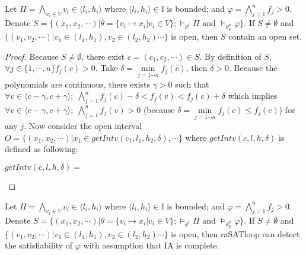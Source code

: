 \begin{lemma} \label{lem:sat-complete}
Let $\Pi = \bigwedge\limits_{v_i \in V} v_i \in \langle l_i, h_i \rangle$ where $\langle l_i, h_i \rangle \in \mathbb{I}$ is bounded; and ${\varphi = \bigwedge\limits_{j = 1}^n f_j > 0}$. Denote $S = \{(x_1, x_2, \cdots) | \theta = \{v_i \mapsto x_i | v_i \in V \}; \models_{\theta^I} \Pi \text{ and } \models_{\theta^p_\mathbb{R}}\varphi \}$. If $S \neq \emptyset$ and $\{(v_1, v_2, \cdots) | v_1 \in (l_1, h_1), v_2 \in (l_2, h_2) \cdots \}$ is open, then $S$ contain an open set.
\end{lemma}

\begin{proof}
\sloppy
Because $S \neq \emptyset$, there exist $c = (c_1, c_2, \cdots) \in S$. By definition of $S$, ${\forall j \in \{1, \cdots, n\} f_j(c) > 0}$. Take $\delta = \min\limits_{j=1\cdots n} f_j(c)$, then $\delta > 0$. Because the polynomials are continuous, there exists $\gamma > 0$ such that $\forall v \in \langle c - \gamma, c + \gamma \rangle; \; \bigwedge\limits_{j=1}^n f_j(c) - \delta < f_j(v) < f_j(c) + \delta$ which implies ${\forall v \in \langle c - \gamma, c + \gamma \rangle; \; \bigwedge\limits_{j=1}^n f_j(v) > 0}$ (because $\delta = \min\limits_{j=1\cdots n}f_j(c) \le f_j(c)$) for any $j$.
Now consider the open interval $O = \{(x_1, x_2, \cdots) | x_1 \in getIntv(c_1, l_1, h_2, \delta), \cdots \}$ where $getIntv(c, l, h, \delta)$ is defined as following:
\begin{center}
$getIntv(c, l, h, \delta) = $
\end{center}
\end{proof}


\begin{theorem} \label{theorem:SAT-complete}
Let $\Pi = \bigwedge\limits_{v_i \in V} v_i \in \langle l_i, h_i \rangle$ where $\langle l_i, h_i \rangle \in \mathbb{I}$ is bounded; and ${\varphi = \bigwedge\limits_{j = 1}^n f_j > 0}$. Denote $S = \{(x_1, x_2, \cdots) | \theta = \{v_i \mapsto x_i | v_i \in V \}; \models_{\theta^I} \Pi \text{ and } \models_{\theta^p_\mathbb{R}}\varphi \}$. If $S \neq \emptyset$ and $\{(v_1, v_2, \cdots) | v_1 \in (l_1, h_1), v_2 \in (l_2, h_2) \cdots \}$ is open, then raSATloop can detect the satisfiability of $\varphi$ with assumption that IA is complete.
\end{theorem}


